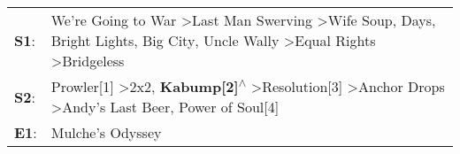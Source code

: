 \begin{supertabular}{p{0.03\textwidth}p{0.92\textwidth}}
 \textbf{S1}:  &  We're Going to War\textsuperscript{} \textgreater \enspace Last Man Swerving\textsuperscript{} \textgreater \enspace Wife Soup\textsuperscript{},  Days\textsuperscript{}, \enspace Bright Lights, Big City\textsuperscript{}, \enspace Uncle Wally\textsuperscript{} \textgreater \enspace Equal Rights\textsuperscript{} \textgreater \enspace Bridgeless\textsuperscript{}  \enspace  \\
 \textbf{S2}:  &                                          Prowler[1]\textsuperscript{} \textgreater \enspace 2x2\textsuperscript{}, \enspace \textbf{Kabump[2]\textsuperscript{$\wedge$}} \textgreater \enspace Resolution[3]\textsuperscript{} \textgreater \enspace Anchor Drops\textsuperscript{} \textgreater \enspace Andy's Last Beer\textsuperscript{}, \enspace Power of Soul[4]\textsuperscript{}  \enspace  \\
 \textbf{E1}:  &                                                                                                                                                                                                                                                                                                                                                        Mulche's Odyssey\textsuperscript{}  \enspace  \\
\end{supertabular}
